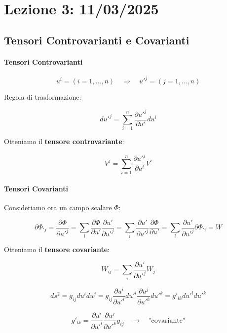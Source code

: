 \newpage

\chapter{Lezione 3: 11/03/2025}

\section{Tensori Controvarianti e Covarianti}

\subsubsection{Tensori Controvarianti}

$$
u^i = (i = 1, \dots, n) \quad \Rightarrow \quad u'^j = (j = 1, ..., n)
$$

Regola di trasformazione:

$$
du'^j = \sum_{i=1}^{n} \dfrac {\partial u'^j}{\partial u^i} du^i
$$

Otteniamo il \textbf{tensore controvariante}:

$$
\boxed{
V^{j} = \sum_{i=1}^{n} \dfrac {\partial u'^j}{\partial u^i} V^{i} 
}
$$

\subsubsection{Tensori Covarianti}

Consideriamo ora un campo scalare $\Phi$:

$$
\partial \Phi_{'j} = \dfrac{\partial \Phi} {\partial u'^j} 
= \sum_i \dfrac{\partial \Phi} {\partial u'} \dfrac{\partial u'} {\partial u'^j}
= \sum_i \dfrac{\partial u'} {\partial u'^j} \dfrac{\partial \Phi} {\partial u'} 
= \sum_i \dfrac{\partial u'} {\partial u'^j} \partial \Phi_{'i} = W
$$

Otteniamo il \textbf{tensore covariante}:

$$
\boxed{
W_{ij} = \sum_i \dfrac{\partial u'} {\partial u'^j} W_j
}
$$

$$
ds^2 = g_{ij} du^i du^j = g_{ij} \dfrac {\partial u^i}{\partial u'^l} du'^l \dfrac {\partial u^j}{\partial u'^k} du'^k = g'_{lk} du'^l du'^k 
$$

$$
g'_{lk} = \dfrac {\partial u^i}{\partial u'^l} \dfrac {\partial u^j}{\partial u'^k} g_{ij} \quad \rightarrow \quad \text{"covariante"}
$$

